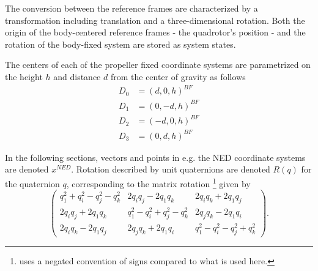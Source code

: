         The conversion between the reference frames are characterized by a
        transformation including translation and a three-dimensional rotation.
        Both the origin of the body-centered reference frames
        - the quadrotor's position - and the rotation of the body-fixed
        system are stored as system states.

        The centers of each of the propeller fixed coordinate systems
        are parametrized on the height $h$ and distance $d$ from the center of
        gravity as follows
        \begin{align}
            D_{0} &= (d, 0, h)^{BF} \\
            D_{1} &= (0, -d, h)^{BF} \\
            D_{2} &= (-d, 0, h)^{BF} \\
            D_{3} &= (0, d, h)^{BF}
        \end{align}

        In the following sections, vectors and points in e.g. the NED
        coordinate systems are denoted $x^{NED}$.
        Rotation described by unit quaternions are denoted $R(q)$ for
        the quaternion $q$, corresponding to the matrix rotation
        \citep{kuipers2002quaternions}\footnote{\citep{kuipers2002quaternions} uses a negated convention of signs compared to what is used here.}
        given by
        \begin{equation}
            \left(
            \begin{array}{cccc}
                q_{1}^{2} + q_{i}^{2} - q_{j}^{2} - q_{k}^{2}   & 2q_{i}q_{j}-2q_{1}q_{k}                       & 2q_{i}q_{k} + 2q_{1}q_{j} \\
                2q_{i}q_{j} + 2q_{1}q_{k}                       & q_{1}^{2} - q_{i}^{2} + q_{j}^{2} - q_{k}^{2} & 2q_{j}q_{k} - 2q_{1}q_{i} \\
                2q_{i}q_{k} - 2q_{1}q_{j}                       & 2q_{j}q_{k} + 2q_{1}q_{i}                     & q_{1}^{2} - q_{i}^{2} - q_{j}^{2} + q_{k}^{2}
            \end{array}
            \right) .
        \end{equation}

